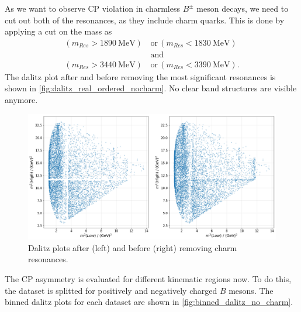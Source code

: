 As we want to observe CP violation in charmless $B^{\pm}$ meson decays, we need to cut out both of the resonances, as they include charm quarks. This is done by applying a cut on the mass as 
\begin{align*}
  (m_{Res} > \qty{1890}{\mega\electronvolt}) \, &\mathrm{or} \, (m_{Res} < \qty{1830}{\mega\electronvolt})\\
  &\mathrm{and} \\
  (m_{Res} > \qty{3440}{\mega\electronvolt}) \, &\mathrm{or} \, (m_{Res} < \qty{3390}{\mega\electronvolt}).
\end{align*}
The dalitz plot after and before removing the most significant resonances is shown in \autoref{fig:dalitz_real_ordered_nocharm}. No clear band structures are visible anymore.
\begin{figure}
  \centering
  \includegraphics[width = .95\textwidth]{"content/pics/dalitz_real_ordered_no_charm.png"}
  \caption{Dalitz plots after (left) and before (right) removing charm resonances.}
  \label{fig:dalitz_real_ordered_nocharm}
\end{figure}
The CP asymmetry is evaluated for different kinematic regions now. To do this, the dataset is splitted for positively and negatively charged $B$ mesons. The binned dalitz plots for each dataset are shown in \autoref{fig:binned_dalitz_no_charm}.
